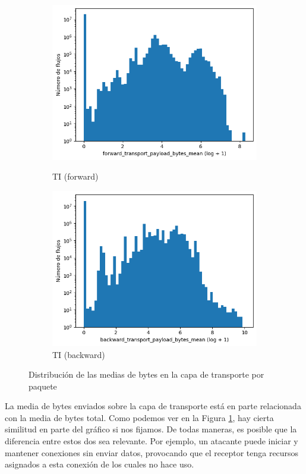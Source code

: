 \begin{figure}[H]
\begin{subfigure}[b]{0.26\textwidth}
        \includegraphics[width=\linewidth]{media/packet_pincer_toniot/forward_transport_payload_bytes_mean_log_x_log_y.png}
        \caption{TI (forward)}
        \includegraphics[width=\linewidth]{media/packet_pincer_toniot/backward_transport_payload_bytes_mean_log_x_log_y.png}
        \caption{TI (backward)}
    \end{subfigure}
       \caption{Distribución de las medias de bytes en la capa de transporte por paquete}
       \label{fig:packet_pincer_bidirectional_transport_payload_bytes_mean}
\end{figure}

La media de bytes enviados sobre la capa de transporte está en parte relacionada con la media de bytes total. Como podemos ver en la Figura \ref{fig:packet_pincer_bidirectional_transport_payload_bytes_mean}, hay cierta similitud en parte del gráfico si nos fijamos. De todas maneras, es posible que la diferencia entre estos dos sea relevante. Por ejemplo, un atacante puede iniciar y mantener conexiones sin enviar datos, provocando que el receptor tenga recursos asignados a esta conexión de los cuales no hace uso.

